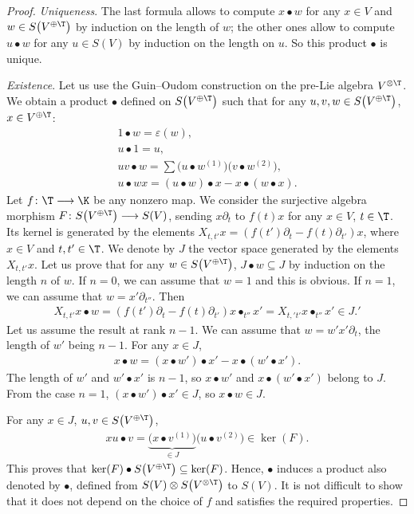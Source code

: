 \begin{proof} \textit{Uniqueness}. The last formula allows to compute $x\bullet w$ for any $x\in V$
and $w\in S\big(V^{\oplus\T}\big)$ by induction on the length of $w$;
the other ones allow to compute $u\bullet w$ for any $u\in S(V)$ by induction on the length on $u$.
So this product $\bullet$ is unique.

\textit{Existence}. Let us use the Guin--Oudom construction \cite{Guin1,Guin2} on the pre-Lie algebra $V^{\otimes \T}$.
We obtain a product $\bullet$
defined on $S\big(V^{\oplus\T}\big)$ such that for any $u,v,w\in S\big(V^{\oplus\T}\big)$, $x\in V^{\oplus \T}$:
\begin{gather*}
1\bullet w=\varepsilon(w),
\\
u\bullet 1=u,
\\
uv\bullet w=\sum \big(u\bullet w^{(1)}\big)\big(v\bullet w^{(2)}\big),
\\
u\bullet w x=(u\bullet w)\bullet x-x\bullet (w\bullet x).
\end{gather*}
Let $f\colon \T\longrightarrow \K$ be any nonzero map. We consider the surjective algebra morphism
$F\colon S\big(V^{\oplus\T}\big)\allowbreak\longrightarrow S(V)$,
sending $x\partial_t$ to $f(t)x$ for any $x\in V$, $t\in \T$. Its kernel is generated by the elements
$X_{t,t'}x=(f(t')\partial_t-f(t)\partial_{t'})x$,
where $x\in V$ and $t,t'\in \T$. We denote by $J$ the vector space generated by the elements $X_{t,t'}x$.
Let us prove that for any $w\in S\big(V^{\oplus\T}\big)$, $J\bullet w\subseteq J$ by induction on the length $n$ of $w$.
If $n=0$, we can assume that $w=1$ and this is obvious. If $n=1$, we can assume that $w=x'\partial_{t''}$. Then
\begin{gather*}
X_{t,t'}x\bullet w=(f(t')\partial_t-f(t)\partial_{t'}) x\bullet_{t''} x'
=X_{t,'t'}x\bullet_{t''} x' \in J.'
\end{gather*}
Let us assume the result at rank $n-1$. We can assume that $w=w' x'\partial_t$, the length of $w'$ being $n-1$.
For any $x\in J$,
\begin{gather*}
x\bullet w=(x\bullet w')\bullet x'-x\bullet(w'\bullet x').
\end{gather*}
The length of $w'$ and $w'\bullet x'$ is $n-1$, so $x\bullet w'$ and $x\bullet (w'\bullet x')$ belong to $J$.
From the case $n=1$,
$(x\bullet w')\bullet x'\in J$, so $x\bullet w\in J$.

For any $x\in J$, $u,v\in S\big(V^{\oplus\T}\big)$,
\begin{gather*}
xu\bullet v=\underbrace{\big(x\bullet v^{(1)}\big)}_{\in J} \big(u\bullet v^{(2)}\big) \in \ker(F).
\end{gather*}
This proves that $\ker(F)\bullet S\big(V^{\oplus\T}\big)\subseteq \ker(F)$. Hence, $\bullet$ induces a product also denoted by $\bullet$,
defined from $S(V)\otimes S\big(V^{\otimes \T}\big)$ to $S(V)$. It is not difficult to show that it does not depend on the choice of $f$
and satisfies the required properties.
\end{proof}

